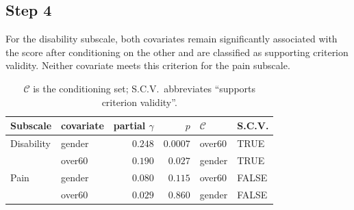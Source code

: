 \subsection{Step 4}
For the disability subscale, both covariates remain significantly associated with the score after conditioning on the other and are classified as supporting criterion validity. Neither covariate meets this criterion for the pain subscale.
\begin{table}[H]
    \centering
    \begin{tabular}{l|l r r l l}
    \hline 
         Subscale  & covariate & partial $\gamma$ & $p$ & $\mathcal{C}$ & S.C.V. \\
         \hline
         Disability &  gender &  $0.248$ &  $0.0007$               &   over60 &    TRUE \\
        & over60 & $0.190$  & $0.027$ & gender & TRUE \\
        \hline
        Pain & gender & $0.080$ & $0.115$  & over60 &   FALSE \\
        &  over60 & $0.029$ & $ 0.860$ & gender&  FALSE \\
        \hline
    \end{tabular}
    \caption{$\mathcal{C}$ is the conditioning set; S.C.V.\ abbreviates ``supports criterion validity''.}
    \label{tab:placeholder}
\end{table}


